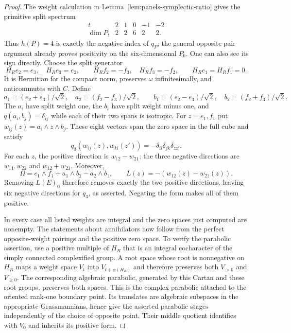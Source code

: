 \begin{proof}
The weight calculation in
Lemma~\ref{lem:panels-symplectic-ratio} gives the primitive
split spectrum
\[
\begin{array}{c|rrrrr}
 t&2&1&0&-1&-2\\ \hline
 \dim P_t&2&2&6&2&2.
\end{array}
\]
Thus $h(P)=4$ is exactly the negative index of $q_P$;
the general opposite-pair argument already proves positivity
on the six-dimensional $P_0$. One can also see its sign
directly. Choose the split generator
\[
 H_Re_2=e_3,\quad H_Re_3=e_2,\qquad
 H_Rf_2=-f_3,\quad H_Rf_3=-f_2,\qquad
 H_Re_1=H_Rf_1=0.
\]
It is Hermitian for the compact norm, preserves $\omega$
infinitesimally, and anticommutes with $C$. Define
\[
 a_1=(e_2+e_3)/\sqrt2,\quad
 a_2=(f_2-f_3)/\sqrt2,\qquad
 b_1=(e_2-e_3)/\sqrt2,\quad
 b_2=(f_2+f_3)/\sqrt2.
\]
The $a_i$ have split weight one, the $b_i$ have split
weight minus one, and $q(a_i,b_j)=\delta_{ij}$ while
each of their two spans is isotropic. For $z=e_1,f_1$ put
$w_{ij}(z)=a_i\wedge z\wedge b_j$. These eight vectors
span the zero space in the full cube and satisfy
\[
 q_3(w_{ij}(z),w_{kl}(z'))
       =-\delta_{il}\delta_{jk}\delta_{zz'}.
\]
For each $z$, the positive direction is $w_{12}-w_{21}$;
the three negative directions are $w_{11},w_{22}$ and
$w_{12}+w_{21}$. Moreover,
\[
 \Omega=e_1\wedge f_1+a_1\wedge b_2-a_2\wedge b_1,
 \qquad L(z)=-(w_{12}(z)-w_{21}(z)).
\]
Removing $L(E)_0$ therefore removes exactly the two positive
directions, leaving six negative directions for $q_3$, as
asserted. Negating the form makes all of them positive.

In every case all listed weights are integral and the zero
spaces just computed are nonempty. The statements about
annihilators now follow from the perfect opposite-weight
pairings and the positive zero space. To verify the parabolic
assertion, use a positive multiple of $H_R$ that is an
integral cocharacter of the simply connected complexified
group. A root space whose root is nonnegative on $H_R$
maps a weight space $V_t$ into $V_{t+\alpha(H_R)}$ and
therefore preserves both $V_{>0}$ and $V_{\geq0}$.
The corresponding algebraic parabolic, generated by this
Cartan and these root groups, preserves both spaces. This is
the complex parabolic attached to the oriented rank-one
boundary point. Its translates are algebraic subspaces in
the appropriate Grassmannians, hence give the asserted
parabolic stages independently of the choice of opposite
point. Their middle quotient identifies with $V_0$ and
inherits its positive form.
\end{proof}

